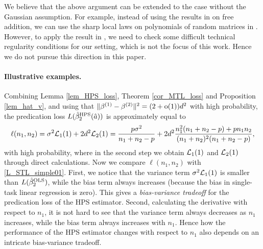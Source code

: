 We believe that the above argument can be extended to the case without the Gaussian assumption. For example, instead of using the results in \cite{BES_free1,BES_free2} on free addition, we can use the sharp local laws on polynomials of random matrices in \cite{EKN_poly}. However, to apply the result in \cite{EKN_poly}, we need to check some difficult technical regularity conditions for our setting, which is not the focus of this work. Hence we do not pursue this direction in this paper.


\paragraph{Illustrative examples.}
Combining Lemma \ref{lem_HPS_loss}, Theorem \ref{cor_MTL_loss} and Proposition \ref{lem_hat_v}, and using  that $\|\beta^{(1)}-\beta^{(2)}\|^2 = (2+\oo(1))d^2$ with high probability, the predication loss $L(\hat{\beta}_2^{\MTL}(\hat a)) $ is approximately equal to
$$\ell(n_1,n_2)= \sigma^2 \cal L_1(1) +   2d^2 \cal L_2(1)= \frac{p\sigma^2}{n_1+n_2-p} +  2d^2  \frac{n_1^2 (n_1+n_2-p)+p n_1n_2}{(n_1+n_2)^2(n_1+n_2-p)}, $$
with high probability, where in the second step we obtain $\cal L_1(1)$ and $\cal L_2(1)$ through direct calculations.
Now we compare $\ell(n_1,n_2)$ with \eqref{L_STL_simple01}. First, we notice that the variance term $\sigma^2 \cal L_1(1)$ is smaller than $L(\hat{\beta}_2^{\STL} )$, while the bias term always increases (because the bias in single-task linear regression is zero). This gives a \emph{bias-variance tradeoff} for the predication loss of the HPS estimator. Second, calculating the derivative with respect to $n_1$, it is not hard to see that the variance term always decreases as $n_1$ increases, while the bias term always increases with $n_1$. Hence how the performance of the HPS estimator changes with respect to $n_1$ also depends on an intricate bias-variance tradeoff.

